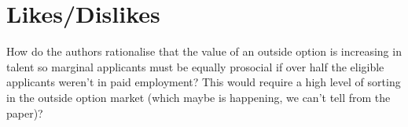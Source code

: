 \documentclass{article}
\begin{document}
\section*{Likes/Dislikes}

How do the authors rationalise that the value of an outside option is increasing 
in talent so marginal applicants must be equally prosocial if over half the eligible 
applicants weren't in paid employment? This would require a high level of
sorting in the outside option market (which maybe is happening, we can't tell 
from the paper)?
\end{document}
